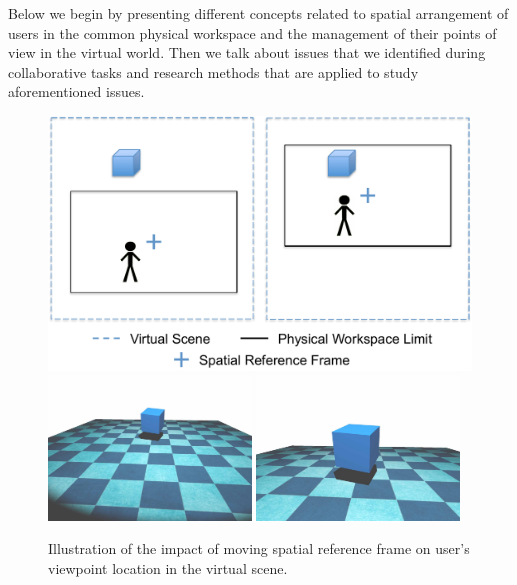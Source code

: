 Below we begin by presenting different concepts related to spatial arrangement of users in the common physical workspace and the management of their points of view in the virtual world. Then we talk about issues that we identified during collaborative tasks and research methods that are applied to study aforementioned issues.

\begin{figure}[htb]
  \centering
  \includegraphics[width=.8\textwidth]{figures/ch2/referenceframe}
  \includegraphics[width=0.48\textwidth]{figures/ch2/ref_1}
  \includegraphics[width=0.48\textwidth]{figures/ch2/ref_2}
  \caption{\label{fig:2_reference}Illustration of the impact of moving spatial reference frame on user's viewpoint location in the virtual scene.}
\end{figure}

